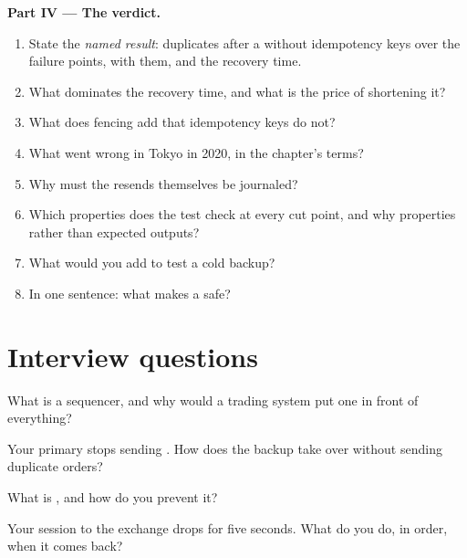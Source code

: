 \begin{problem}
\medskip\noindent\textbf{Part IV --- The verdict.}
\begin{enumerate}[resume]
\item State the \emph{named result}: duplicates after a  without idempotency keys over the failure points, with them,
and the recovery time.
\item What dominates the recovery time, and what is the price of shortening it?
\item What does fencing add that idempotency keys do not?
\item What went wrong in Tokyo in 2020, in the chapter's terms?
\item Why must the resends themselves be journaled?
\item Which properties does the test check at every cut point, and why properties rather than expected outputs?
\item What would you add to test a cold backup?
\item In one sentence: what makes a  safe?
\end{enumerate}
\end{problem}

\section{Interview questions}

\begin{interviewq}\label{iq:ll:resilience:1}
What is a sequencer, and why would a trading system put one in front of everything?
\end{interviewq}

\begin{interviewq}\label{iq:ll:resilience:2}
Your primary stops sending . How does the backup take over without sending duplicate orders?
\end{interviewq}

\begin{interviewq}\label{iq:ll:resilience:3}
What is , and how do you prevent it?
\end{interviewq}

\begin{interviewq}\label{iq:ll:resilience:4}
Your session to the exchange drops for five seconds. What do you do, in order, when it comes back?
\end{interviewq}

